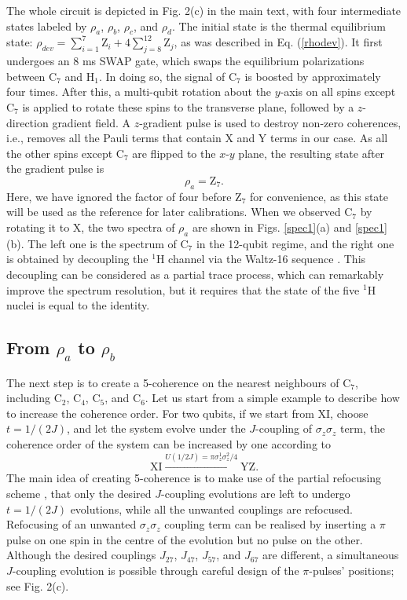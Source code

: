 \documentclass[twocolumn,reprint, amsmath,amssymb,showpacs,superscriptaddress]{revtex4-1}
\newcommand{\be}{\begin{equation}}
\newcommand{\ee}{\end{equation}}
\begin{document}
The whole circuit is depicted in Fig. 2(c) in the main text, with four intermediate states labeled by $\rho_a$, $\rho_b$, $\rho_c$, and $\rho_d$. The initial state is  the thermal equilibrium state: $\rho_{dev} = \sum_{i=1}^7 \text{Z}_{i}+ 4 \sum_{j=8}^{12} \text{Z}_{j}$, as was described in Eq. (\ref{rhodev}). It first undergoes an 8 ms SWAP gate, which swaps the equilibrium polarizations between C$_7$ and H$_1$. In   doing so,   the signal of C$_7$ is boosted by approximately four times. After this, a multi-qubit rotation about the $y$-axis on all spins except C$_7$ is applied to rotate these spins to the transverse plane, followed by a $z$-direction gradient field. A $z$-gradient pulse is used to destroy non-zero coherences, i.e., removes all the Pauli terms that contain X and Y terms in our case. As all the other spins except C$_7$ are flipped to the $x$-$y$ plane, the resulting state after the gradient pulse is
\be
\rho_a = \text{Z}_7.
\label{rhoa}
\ee
Here, we have ignored the factor of four before $\text{Z}_7$ for convenience, as this state will be used as the reference for later calibrations. When we observed C$_7$ by rotating it to X, the two spectra of $\rho_a$ are shown in Figs. \ref{spec1}(a) and \ref{spec1}(b). The left one is the spectrum of C$_7$ in the 12-qubit regime, and the right one is obtained by decoupling the $^1$H channel via the Waltz-16 sequence \cite{shaka1983evaluation}. This decoupling can be considered as a partial trace process, which can remarkably improve the spectrum resolution, but it requires that the state of the five $^1$H nuclei is equal to the identity.


\subsection{From $\rho_a$ to $\rho_b$}




The next step is to create a 5-coherence on the nearest neighbours of C$_7$, including C$_2$, C$_4$, C$_5$, and C$_6$. Let us start from a simple example to describe how to increase the coherence order. For two qubits, if we start from XI, choose $t = 1/(2J)$, and let the system evolve under the $J$-coupling of $\sigma_z \sigma_z$ term, the coherence order of the system can be increased by one according to
\be
\text{XI} \xrightarrow{U\left( 1/2J\right) =  \pi \sigma_z^1 \sigma_z^2/4} \text{YZ}.
\label{zz}
\ee
The main idea of creating 5-coherence is to make use of the partial refocusing scheme \cite{lu2015experimental}, that only the desired $J$-coupling evolutions are left to undergo $t = 1/(2J)$ evolutions, while all the unwanted couplings are refocused. Refocusing of an unwanted $\sigma_z \sigma_z$ coupling term can be realised by inserting a $\pi$ pulse on one spin in the centre of the evolution but no pulse on the other. Although the desired couplings $J_{27}$, $J_{47}$, $J_{57}$, and $J_{67}$ are different, a simultaneous $J$-coupling evolution is possible through careful design of the $\pi$-pulses' positions; see Fig. 2(c).
\end{document}
